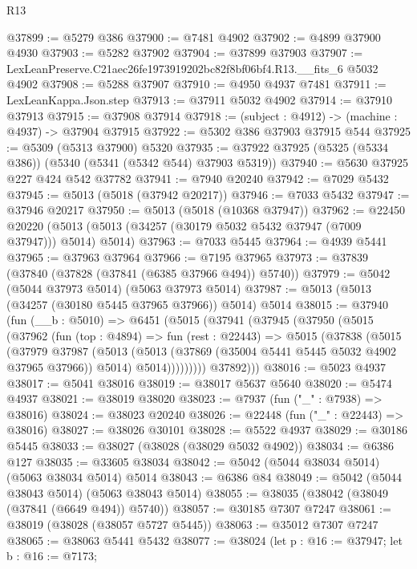 \begin{lexlean}{R13}
\begin{coremodule}
@37899 := @5279 @386
@37900 := @7481 @4902
@37902 := @4899 @37900 @4930
@37903 := @5282 @37902
@37904 := @37899 @37903
@37907 := LexLeanPreserve.C21aec26fe1973919202bc82f8bf06bf4.R13.__fits_6 @5032 @4902
@37908 := @5288 @37907
@37910 := @4950 @4937 @7481
@37911 := LexLeanKappa.Json.step
@37913 := @37911 @5032 @4902
@37914 := @37910 @37913
@37915 := @37908 @37914
@37918 := (subject : @4912) -> (machine : @4937) -> @37904 @37915
@37922 := @5302 @386 @37903 @37915 @544
@37925 := @5309 (@5313 @37900) @5320
@37935 := @37922 @37925 (@5325 (@5334 @386)) (@5340 (@5341 (@5342 @544) @37903 @5319))
@37940 := @5630 @37925 @227 @424 @542 @37782
@37941 := @7940 @20240
@37942 := @7029 @5432
@37945 := @5013 (@5018 (@37942 @20217))
@37946 := @7033 @5432
@37947 := @37946 @20217
@37950 := @5013 (@5018 (@10368 @37947))
@37962 := @22450
    @20220
    (@5013 (@5013 (@34257 (@30179 @5032 @5432 @37947 (@7009 @37947))) @5014) @5014)
@37963 := @7033 @5445
@37964 := @4939 @5441
@37965 := @37963 @37964
@37966 := @7195 @37965
@37973 := @37839 (@37840 (@37828 (@37841 (@6385 @37966 @494)) @5740))
@37979 := @5042 (@5044 @37973 @5014) (@5063 @37973 @5014)
@37987 := @5013 (@5013 (@34257 (@30180 @5445 @37965 @37966)) @5014) @5014
@38015 := @37940
    (fun (__b : @5010) =>
    @6451
      (@5015
        (@37941
          (@37945
            (@37950
              (@5015
                (@37962
                  (fun (top : @4894) =>
                  fun (rest : @22443) =>
                  @5015
                    (@37838
                      (@5015
                        (@37979
                          @37987
                          (@5013
                            (@5013 (@37869 (@35004 @5441 @5445 @5032 @4902 @37965 @37966)) @5014)
                            @5014)))))))))
          @37892)))
@38016 := @5023 @4937
@38017 := @5041 @38016
@38019 := @38017 @5637 @5640
@38020 := @5474 @4937
@38021 := @38019 @38020
@38023 := @7937 (fun ("_" : @7938) => @38016)
@38024 := @38023 @20240
@38026 := @22448 (fun ("_" : @22443) => @38016)
@38027 := @38026 @30101
@38028 := @5522 @4937
@38029 := @30186 @5445
@38033 := @38027 (@38028 (@38029 @5032 @4902))
@38034 := @6386 @127
@38035 := @33605 @38034
@38042 := @5042 (@5044 @38034 @5014) (@5063 @38034 @5014) @5014
@38043 := @6386 @84
@38049 := @5042 (@5044 @38043 @5014) (@5063 @38043 @5014)
@38055 := @38035 (@38042 (@38049 (@37841 (@6649 @494)) @5740))
@38057 := @30185 @7307 @7247
@38061 := @38019 (@38028 (@38057 @5727 @5445))
@38063 := @35012 @7307 @7247
@38065 := @38063 @5441 @5432
@38077 := @38024
    (let p : @16 := @37947;
    let b : @16 := @7173;

\end{coremodule}
\end{lexlean}
